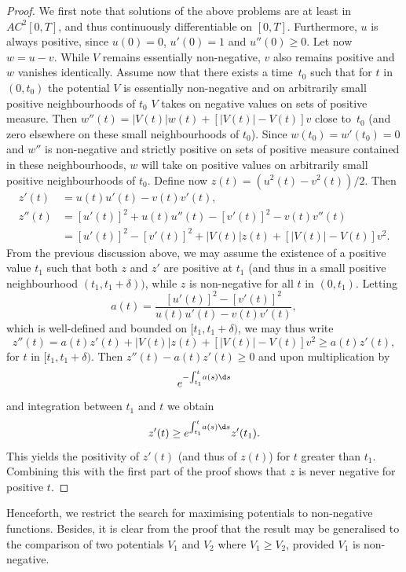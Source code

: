 \begin{proof}
We first note that solutions of the above problems are at least in $AC^2[0,T]$, and
thus continuously differentiable on $[0,T]$.
Furthermore, $u$ is always positive,
since $u(0)=0$, $u'(0)=1$ and $u''(0)\geq0$.
Let now $w=u-v$. While $V$ remains essentially non-negative, $v$ also remains positive and $w$ vanishes identically.
Assume now that there exists a time~$t_{0}$ such that for $t$ in $(0,t_{0})$ the potential $V$ is essentially non-negative and on arbitrarily small
positive neighbourhoods of $t_{0}$ $V$ takes on negative values on sets of positive measure. Then $w''(t)=|V(t)|w(t)+\left[ |V(t)|-V(t)\right]v$
close to~$t_{0}$ (and zero elsewhere on these small neighbourhoods of $t_{0}$).
Since $w(t_{0})=w'(t_{0})=0$ and $w''$ is non-negative and strictly positive on sets of positive measure contained in these neighbourhoods, $w$
will take on positive values on arbitrarily small positive neighbourhoods of $t_{0}$.
Define now $z(t) = (u^{2}(t)-v^{2}(t))/2$. Then
\begin{align*}
z'(t) &= u(t)u'(t)-v(t)v'(t),\\
\tag*{and}
z''(t) & = \left[u'(t)\right]^2+u(t)u''(t)-\left[v'(t)\right]^2-v(t)v''(t)\\
& = \left[u'(t)\right]^2-\left[v'(t)\right]^2 + |V(t)|z(t) + \left[|V(t)|-V(t)\right]v^2.
\end{align*}
From the previous discussion above, we may assume the existence of a positive value $t_{1}$ such that both $z$ and $z'$ are positive at $t_{1}$ (and thus
in a small positive neighbourhood $(t_{1},t_{1}+\delta))$, while $z$ is non-negative for all $t$ in $(0,t_{1})$. Letting
\[
a(t) = \frac{ \left[u'(t)\right]^2-\left[v'(t)\right]^2}{ u(t)u'(t)-v(t)v'(t)},
\]
which is well-defined and bounded on $[t_{1},t_{1}+\delta)$, we may thus write
\[
z''(t) = a(t)z'(t)+|V(t)|z(t) + \left[|V(t)|-V(t)\right]v^2 \geq a(t) z'(t),
\]
for $t$ in $[t_{1},t_{1}+\delta)$. Then $z''(t)-a(t)z'(t)\geq0$ and upon multiplication by
\[
e^{-{\int_{t_{1}}^{t}} a(s)\d s}
\]
and integration between $t_{1}$ and $t$ we obtain
\[
z'(t)\geq e^{{\int_{t_{1}}^{t}} a(s)\d s}z'(t_{1}).
\]
This yields the positivity of $z'(t)$ (and thus of $z(t)$) for $t$ greater than $t_{1}$. Combining this with the first part of the proof shows that
$z$ is never negative for positive $t$.
\end{proof}

Henceforth, we restrict the search for maximising potentials to non-negative functions.
Besides, it is clear from the proof that the result may be generalised to the comparison
of two potentials $V_{1}$ and $V_{2}$ where $V_{1}\geq V_{2}$, provided $V_{1}$ is non-negative.

